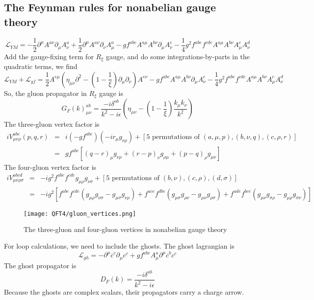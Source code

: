 \documentclass[cyan]{elegantnote}
\begin{document}
\subsection{The Feynman rules for nonabelian gauge theory}
\[\mathcal{L}_{YM} = -\frac{1}{2}\partial^{\mu}A^{a\nu} \partial_{\mu}A^a_{\nu} + \frac{1}{2}\partial^{\mu}A^{a\nu} \partial_{\nu}A^a_{\mu} -gf^{abe}A^{a\mu}A^{b\nu}\partial_{\mu}A^e_{\nu} - \frac{1}{4}g^2 f^{abe}f^{cde}A^{a\mu}A^{b\nu}A^c_{\mu}A^d_{\nu}\]
Add the gauge-fixing term for $R_{\xi}$ gauge, and do some integrations-by-parts in the quadratic terms, we find
\[\mathcal{L}_{YM} + \mathcal{L}_{gf} = \frac{1}{2}A^{e\mu}(\eta_{\mu\nu}\partial^2 -(1-\frac{1}{\xi}) \partial_{\mu}\partial_{\nu})A^{e\nu} -gf^{abe}A^{a\mu}A^{b\nu}\partial_{\mu}A^e_{\nu} - \frac{1}{4}g^2 f^{abe}f^{cde}A^{a\mu}A^{b\nu}A^c_{\mu}A^d_{\nu}\]
So, the gluon propagator in $R_{\xi}$ gauge is
\[G_F(k)^{ab}_{\mu\nu} = \frac{-i\delta^{ab}}{k^2-i\epsilon} \left( \eta_{\mu\nu} - (1 - \frac{1}{\xi}) \frac{k_{\mu}k_{\nu}}{k^2} \right)\]
The three-gluon vertex factor is
\begin{eqnarray}
iV^{abc}_{\mu\nu\rho}(p,q,r) &=& i (-gf^{abc})(-ir_{\mu}g_{\nu\rho}) + [5 \mbox{ permutations of } (a,\mu,p),(b,\nu,q),(c,\rho,r)] \nonumber \\
&=& gf^{abc}[(q-r)_{\mu}g_{\nu\rho} + (r-p)_{\nu}g_{\rho\mu} + (p-q)_{\rho}g_{\mu\nu}] \nonumber
\end{eqnarray}
The four-gluon vertex factor is
\begin{eqnarray}
iV^{abcd}_{\mu\nu\rho\sigma} &=& -ig^2f^{abe} f^{cde} g_{\mu\rho}g_{\nu\sigma} + [5 \mbox{ permutations of } (b,\nu),(c,\rho),(d,\sigma)] \nonumber \\
&=& -ig^2 [f^{abe}f^{cde}(g_{\mu\rho}g_{\nu\sigma} - g_{\mu\sigma}g_{\nu\rho}) + f^{ace}f^{dbe}(g_{\mu\sigma}g_{\rho\nu} - g_{\mu\nu}g_{\rho\sigma}) + f^{ade}f^{bce}(g_{\mu\nu}g_{\sigma\rho} - g_{\mu\rho}g_{\sigma\nu})] \nonumber
\end{eqnarray}

\begin{figure}[!h]
	\centering
	\texttt{[image: QFT4/gluon\_vertices.png]}
	\caption{The three-gluon and four-gluon vertices in nonabelian gauge theory}
\end{figure}

\noindent
For loop calculations, we need to include the ghosts. The ghost lagrangian is
\[\mathcal{L}_{gh} = -\partial^{\mu}\overline{c}^c \partial_{\mu}c^c + gf^{abc}A^a_{\mu}\partial^{\mu}\overline{c}^b c^c\]
The ghost propagator is
\[D_F(k) = \frac{-i\delta^{ab}}{k^2-i\epsilon}\]
Because the ghosts are complex scalars, their propagators carry a charge arrow. 
\end{document}
